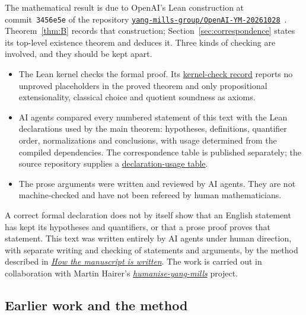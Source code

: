 The mathematical result is due to OpenAI's Lean construction at commit~\texttt{3456e5e} of the repository \href{https://github.com/yang-mills-group/OpenAI-YM-20261028}{\texttt{yang-mills-group/OpenAI-YM-20261028}}~\cite{OpenAI2026YM}. Theorem~\ref{thm:B} records that construction; Section~\ref{sec:correspondence} states its top-level existence theorem and deduces it. Three kinds of checking are involved, and they should be kept apart.
\begin{itemize}[nosep]
\item The Lean kernel checks the formal proof. Its \href{https://github.com/yang-mills-group/OpenAI-YM-20261028/blob/3456e5e75cf8d4cd558955a5c7638fba2d68f464/verification/joint-check.log}{kernel-check record} reports no unproved placeholders in the proved theorem and only propositional extensionality, classical choice and quotient soundness as axioms.
\item AI agents compared every numbered statement of this text with the Lean declarations used by the main theorem: hypotheses, definitions, quantifier order, normalizations and conclusions, with usage determined from the compiled dependencies. The correspondence table is published separately; the source repository supplies a \href{https://github.com/yang-mills-group/OpenAI-YM-20261028/blob/3456e5e75cf8d4cd558955a5c7638fba2d68f464/verification/declaration-usage.tsv}{declaration-usage table}.
\item The prose arguments were written and reviewed by AI agents. They are not machine-checked and have not been refereed by human mathematicians.
\end{itemize}
A correct formal declaration does not by itself show that an English statement has kept its hypotheses and quantifiers, or that a prose proof proves that statement. This text was written entirely by AI agents under human direction, with separate writing and checking of statements and arguments, by the method described in \href{https://github.com/scottnarmstrong/yang-mills-informalization/blob/main/manuscript/PROCESS.md}{\emph{How the manuscript is written}}. The work is carried out in collaboration with Martin Hairer's \href{https://github.com/hairer/humanise-yang-mills}{\emph{humanise-yang-mills}} project.

\subsection{Earlier work and the method}\label{sec:intro-earlier}

